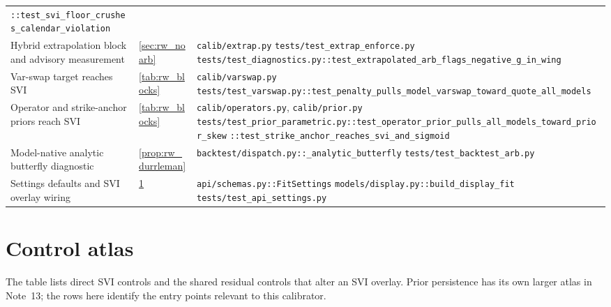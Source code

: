 \documentclass[11pt]{article}
\begin{document}
\begin{longtable}{@{}p{}p{}p{}@{}}
\nolinkurl{::test_svi_floor_crushes_calendar_violation}\\
\addlinespace
Hybrid extrapolation block and advisory measurement &
\cref{sec:rw_noarb} &
\nolinkurl{calib/extrap.py}\newline
\nolinkurl{tests/test_extrap_enforce.py}\newline
\nolinkurl{tests/test_diagnostics.py::test_extrapolated_arb_flags_negative_g_in_wing}\\
\addlinespace
Var-swap target reaches SVI &
\cref{tab:rw_blocks} &
\nolinkurl{calib/varswap.py}\newline
\nolinkurl{tests/test_varswap.py::test_penalty_pulls_model_varswap_toward_quote_all_models}\\
\addlinespace
Operator and strike-anchor priors reach SVI &
\cref{tab:rw_blocks} &
\nolinkurl{calib/operators.py}, \nolinkurl{calib/prior.py}\newline
\nolinkurl{tests/test_prior_parametric.py::test_operator_prior_pulls_all_models_toward_prior_skew}\newline
\nolinkurl{::test_strike_anchor_reaches_svi_and_sigmoid}\\
\addlinespace
Model-native analytic butterfly diagnostic &
\cref{prop:rw_durrleman} &
\nolinkurl{backtest/dispatch.py::_analytic_butterfly}\newline
\nolinkurl{tests/test_backtest_arb.py}\\
\addlinespace
Settings defaults and SVI overlay wiring &
\cref{app:rw_atlas} &
\nolinkurl{api/schemas.py::FitSettings}\newline
\nolinkurl{models/display.py::build_display_fit}\newline
\nolinkurl{tests/test_api_settings.py}\\
\bottomrule
\end{longtable}
\endgroup

\appendix

\section{Control atlas}
\label{app:rw_atlas}

The table lists direct SVI controls and the shared residual controls that alter
an SVI overlay.  Prior persistence has its own larger atlas in Note~13; the rows
here identify the entry points relevant to this calibrator.
\end{document}
